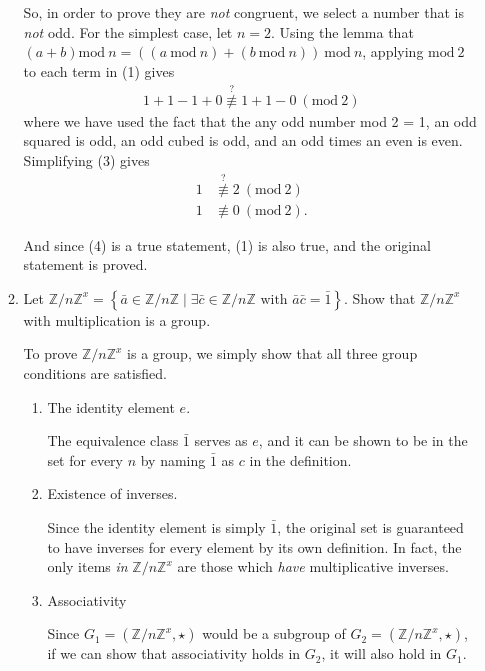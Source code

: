 \documentclass{scrartcl}
\begin{document}
\begin{enumerate}
\begin{enumerate}
		So, in order to prove they are \textit{not} congruent, we select a number that is \textit{not} odd. For the simplest case, let $n=2$. Using the lemma that $(a+b)\textrm{mod}\ n =((	a\ \textrm{mod}\ n) + (b\ \textrm{mod}\ n))\ \textrm{mod}\ n$, applying $\textrm{mod}\ 2$ to each term in (1) gives
		\begin{align}
			1 + 1 - 1 + 0 \stackrel{?}{\not\equiv}  1 + 1 - 0\ (\textrm{mod}\ 2)
		\end{align}
		where we have used the fact that the any odd number mod 2 = 1, an odd squared is odd, an odd cubed is odd, and an odd times an even is even. Simplifying (3) gives
		\begin{align}
			1 &\stackrel{?}{\not\equiv} 2\ (\textrm{mod}\ 2) \nonumber \\
			1 &\not\equiv 0\ (\textrm{mod}\ 2).
		\end{align}
		
		And since (4) is a true statement, (1) is also true, and the original statement is proved.
		
		
		\item Let $\mathbb{Z} /n \mathbb{Z}^x = \left\{ \bar{a} \in \mathbb{Z} /n\mathbb{Z} \mid \exists \bar{c} \in \mathbb{Z} /n \mathbb{Z} \textrm{ with } \bar{a} \bar{c} = \bar{1} \right\}$. Show that $\mathbb{Z} /n \mathbb{Z}^x$ with multiplication is a group.
		
			To prove $\mathbb{Z} /n \mathbb{Z}^x$ is a group, we simply show that all three group conditions are satisfied. 
			
			\begin{enumerate}
			
				\item The identity element $e$. 
				
				The equivalence class $\bar{1}$ serves as $e$, and it can be shown to be in the set for every $n$ by naming $\bar{1}$ as $c$ in the definition.
				
				\item Existence of inverses. 
				
				Since the identity element is simply $\bar{1}$, the original set is guaranteed to have inverses for every element by its own definition. In fact, the only items \textit{in} $\mathbb{Z} /n \mathbb{Z}^x$ are those which \textit{have} multiplicative inverses.
				
				\item Associativity
				
				Since $G_1 = (\mathbb{Z} /n \mathbb{Z}^x, \star)$ would be a subgroup of $G_2 = (\mathbb{Z} /n \mathbb{Z}^x, \star)$, if we can show that associativity holds in $G_2$, it will also hold in $G_1$. 
				

\end{enumerate}
\end{enumerate}
\end{enumerate}
\end{document}

